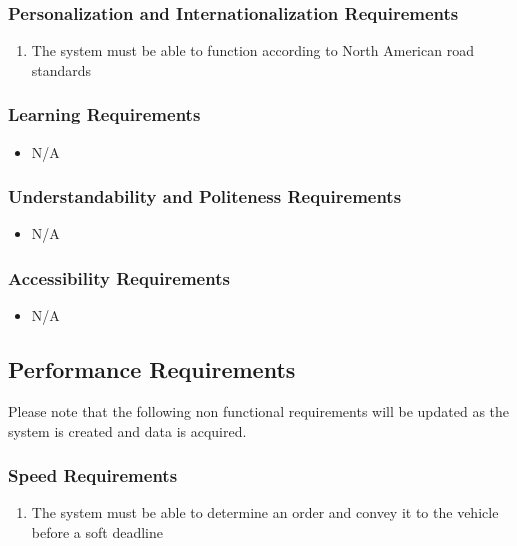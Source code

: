 \documentclass [12pt]{article}
\begin{document}
\subsubsection{Personalization and Internationalization Requirements}
	\begin{enumerate}[label=\textbf{\Alph*}:]
		\item The system must be able to function according to North American road standards
	\end{enumerate}

\subsubsection{Learning Requirements }
	\begin{itemize}
		\item N/A
	\end{itemize}

\subsubsection{Understandability and Politeness Requirements}
	\begin{itemize}
		\item N/A
	\end{itemize}
		
\subsubsection{Accessibility Requirements }
	\begin{itemize}
		\item N/A
	\end{itemize}
 
\subsection{Performance Requirements}
	Please note that the following  non functional requirements will be updated as the system is created and data is acquired.

\subsubsection{Speed Requirements }
	\begin{enumerate}[label=\textbf{\Alph*}:]
		\item The system must be able to determine an order and convey it to the vehicle before a soft deadline
	\end{enumerate}
\end{document}
